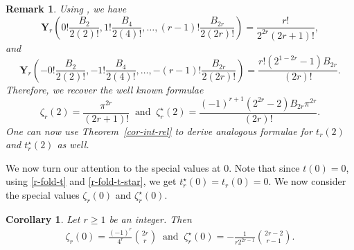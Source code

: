\documentclass[12pt]{amsart}
\newtheorem{cor}{Corollary}
\newtheorem{rmk}{Remark}
\newcommand{\thmref}[1]{Theorem~\ref{#1}}
\begin{document}
\begin{rmk}\label{rmk-value-2}\rm
Using \cite[eq. (1), (2)]{J}, we have 
$$
\mathbf{Y}_r\left(0!\frac{B_{2}}{2(2)!}, 1!\frac{B_{4}}{2(4)!},\ldots,(r-1)!\frac{B_{2r}}{2(2r)!}\right)=\frac{r!}{2^{2r}(2r+1)!},
$$
and 
$$
\mathbf{Y}_r\left(-0!\frac{B_{2}}{2(2)!}, -1!\frac{B_{4}}{2(4)!},\ldots,-(r-1)!\frac{B_{2r}}{2(2r)!}\right)=\frac{r!(2^{1-2r}-1)B_{2r}}{(2r)!}.
$$
Therefore, we recover the well known formulae
$$
\zeta_r(2)=\frac{\pi^{2r}}{(2r+1)!} \ \text{ and } \ \zeta^{\star}_r(2)=\frac{(-1)^{r+1}(2^{2r}-2)B_{2r}\pi^{2r}}{(2r)!}.
$$
One can now use \thmref{cor-int-rel} to derive analogous formulae for $t_r(2)$ and $t^\star_r(2)$ as well.
\end{rmk}


We now turn our attention to the special values at $0$. Note that since $t(0)=0$, using \eqref{r-fold-t} and \eqref{r-fold-t-star}, we get $t^{\star}_r(0)=t_r(0)=0.$
We now consider the special values $\zeta_r(0)$ and $\zeta^{\star}_r(0)$.
\begin{cor}\label{cor-value-zero}
Let $r\geq 1$ be an integer. Then  
\begin{align}\label{eq-zero}
\zeta_r(0)=\frac{(-1)^r}{4^r}\binom{2r}{r}\ \text{ and } \
\zeta^{\star}_r(0)=-\frac{1}{r2^{2r-1}}\binom{2r-2}{r-1}.
\end{align}
\end{cor}
\end{document}
